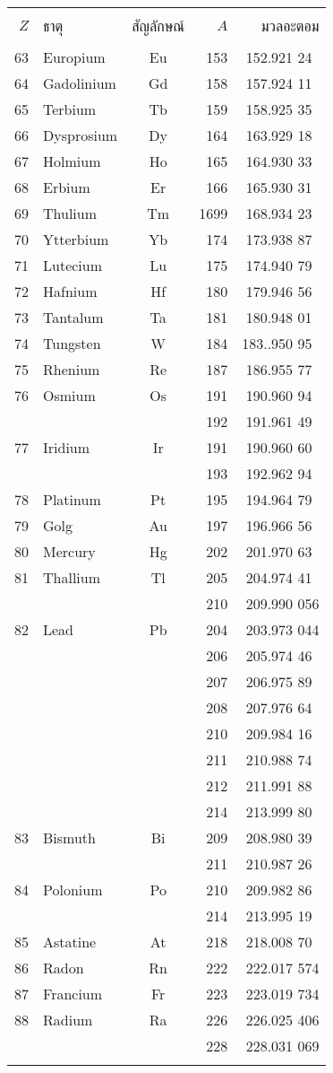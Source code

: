 \begin{tabular}{rlcrr}
\hline\\
$Z$&ธาตุ&สัญลักษณ์&$A$&มวลอะตอม\\
\hline\\
63&Europium&Eu&153&152.921 24\mbox{ }\\
64&Gadolinium&Gd&158&157.924 11\mbox{ }\\
65&Terbium&Tb&159&158.925 35\mbox{ }\\
66&Dysprosium&Dy&164&163.929 18\mbox{ }\\
67&Holmium&Ho&165&164.930 33\mbox{ }\\
68&Erbium&Er&166&165.930 31\mbox{ }\\
69&Thulium&Tm&1699&168.934 23\mbox{ }\\
70&Ytterbium&Yb&174&173.938 87\mbox{ }\\
71&Lutecium&Lu&175&174.940 79\mbox{ }\\
72&Hafnium&Hf&180&179.946 56\mbox{ }\\
73&Tantalum&Ta&181&180.948 01\mbox{ }\\
74&Tungsten&W&184&183..950 95\mbox{ }\\
75&Rhenium&Re&187&186.955 77\mbox{ }\\
76&Osmium&Os&191&190.960 94\mbox{ }\\
&&&192&191.961 49\mbox{ }\\
77&Iridium&Ir&191&190.960 60\mbox{ }\\
&&&193&192.962 94\mbox{ }\\
78&Platinum&Pt&195&194.964 79\mbox{ }\\
79&Golg&Au&197&196.966 56\mbox{ }\\
80&Mercury&Hg&202&201.970 63\mbox{ }\\
81&Thallium&Tl&205&204.974 41\mbox{ }\\
&&&210&209.990 056\\
82&Lead&Pb&204&203.973 044\\
&&&206&205.974 46\mbox{ }\\
&&&207&206.975 89\mbox{ }\\
&&&208&207.976 64\mbox{ }\\
&&&210&209.984 16\mbox{ }\\
&&&211&210.988 74\mbox{ }\\
&&&212&211.991 88\mbox{ }\\
&&&214&213.999 80\mbox{ }\\
83&Bismuth&Bi&209&208.980 39\mbox{ }\\
&&&211&210.987 26\mbox{ }\\
84&Polonium&Po&210&209.982 86\mbox{ }\\
&&&214&213.995 19\mbox{ }\\
85&Astatine&At&218&218.008 70\mbox{ }\\
86&Radon&Rn&222&222.017 574\\
87&Francium&Fr&223&223.019 734\\
88&Radium&Ra&226&226.025 406\\
&&&228&228.031 069\\\\
\hline
\end{tabular}

